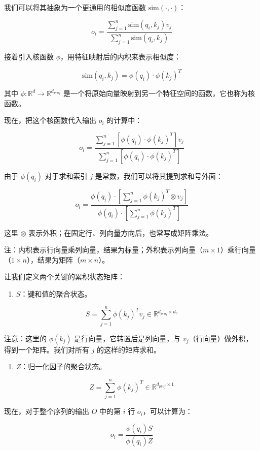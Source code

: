 我们可以将其抽象为一个更通用的相似度函数 \(\mathrm{sim}(\cdot,\cdot)\)：

\[
o_i =
\frac{
\sum_{j=1}^{n} \mathrm{sim}(q_i,k_j)v_j
}{
\sum_{j=1}^{n} \mathrm{sim}(q_i,k_j)
}
\]

接着引入核函数 \(\phi\)，用特征映射后的内积来表示相似度：

\[
\mathrm{sim}(q_i,k_j) = \phi(q_i)\cdot\phi(k_j)^T
\]

其中 \(\phi:\mathbb{R}^{d}\rightarrow\mathbb{R}^{d_{proj}}\) 是一个将原始向量映射到另一个特征空间的函数，它也称为核函数。

现在，把这个核函数代入输出 \(o_i\) 的计算中：

\[
o_i =
\frac{
\sum_{j=1}^{n}[\phi(q_i)\cdot\phi(k_j)^T]v_j
}{
\sum_{j=1}^{n}[\phi(q_i)\cdot\phi(k_j)^T]
}
\]

由于 \(\phi(q_i)\) 对于求和索引 \(j\) 是常数，我们可以将其提到求和号外面：

\[
o_i =
\frac{
\phi(q_i)\cdot\left[\sum_{j=1}^{n}\phi(k_j)^T \otimes v_j\right]
}{
\phi(q_i)\cdot\left[\sum_{j=1}^{n}\phi(k_j)^T\right]
}
\]

这里 \(\otimes\) 表示外积；在固定行、列向量方向后，也常写成矩阵乘法。

注：内积表示行向量乘列向量，结果为标量；外积表示列向量（\(m \times 1\)）乘行向量（\(1 \times n\)），结果为矩阵（\(m \times n\)）。

让我们定义两个关键的累积状态矩阵：

\begin{enumerate}
\def\labelenumi{\arabic{enumi}.}
\tightlist
\item
  \(S\)：键和值的聚合状态。
\end{enumerate}

\[
S = \sum_{j=1}^{n}\phi(k_j)^T v_j \in \mathbb{R}^{d_{proj}\times d_v}
\]

注意：这里的 \(\phi(k_j)\) 是行向量，它转置后是列向量，与 \(v_j\)（行向量）做外积，得到一个矩阵。我们对所有 \(j\) 的这样的矩阵求和。

\begin{enumerate}
\def\labelenumi{\arabic{enumi}.}
\setcounter{enumi}{1}
\tightlist
\item
  \(Z\)：归一化因子的聚合状态。
\end{enumerate}

\[
Z = \sum_{j=1}^{n}\phi(k_j)^T \in \mathbb{R}^{d_{proj}\times 1}
\]

现在，对于整个序列的输出 \(O\) 中的第 \(i\) 行 \(o_i\)，可以计算为：

\[
o_i = \frac{\phi(q_i)S}{\phi(q_i)Z}
\]

